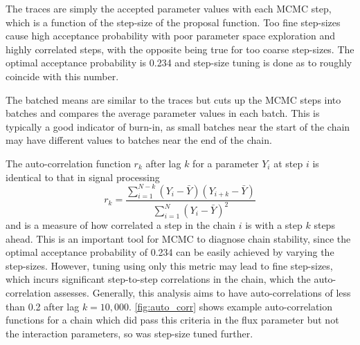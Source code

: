The traces are simply the accepted parameter values with each MCMC step, which is a function of the step-size of the proposal function. Too fine step-sizes cause high acceptance probability with poor parameter space exploration and highly correlated steps, with the opposite being true for too coarse step-sizes. The optimal acceptance probability is 0.234\cite{step_prop,mcmc_handbook} and step-size tuning is done as to roughly coincide with this number.

The batched means are similar to the traces but cuts up the MCMC steps into batches and compares the average parameter values in each batch. This is typically a good indicator of burn-in, as small batches near the start of the chain may have different values to batches near the end of the chain.

The auto-correlation function $r_k$ after lag $k$ for a parameter $Y_i$ at step $i$ is identical to that in signal processing 
\begin{equation}
r_k = \frac{\sum_{i=1}^{N-k}\left(Y_i-\bar{Y}\right) \left(Y_{i+k} - \bar{Y}\right)} {\sum_{i=1}^N \left(Y_i-\bar{Y}\right)^2 }
\end{equation}
and is a measure of how correlated a step in the chain $i$ is with a step $k$ steps ahead. This is an important tool for MCMC to diagnose chain stability, since the optimal acceptance probability of 0.234 can be easily achieved by varying the step-sizes. However, tuning using only this metric may lead to fine step-sizes, which incurs significant step-to-step correlations in the chain, which the auto-correlation assesses. Generally, this analysis aims to have auto-correlations of less than 0.2 after lag $k=10,000$. \autoref{fig:auto_corr} shows example auto-correlation functions for a chain which did pass this criteria in the flux parameter but not the interaction parameters, so was step-size tuned further.
